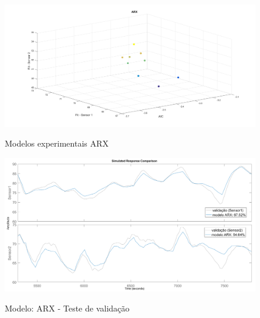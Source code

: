 \begin{apendicesenv}
\begin{figure}[h]
	\caption{Modelos experimentais ARX}
	\begin{center}
		\includegraphics[width=1.00\textwidth]{./5_images/tclabsp-models-ARX.png} 
		\label{fig:tclabsp-models-arx}
	\end{center}
	\centering
\end{figure}

\begin{figure}
	\caption{Modelo: ARX - Teste de validação}
	\begin{center}
		\includegraphics[width=1.00\textwidth]{./5_images/tclabsp-models-ARX-compare.png} 
		\label{fig:tclabsp-models-arx-compare}
	\end{center}
	\centering
\end{figure}


\end{apendicesenv}
